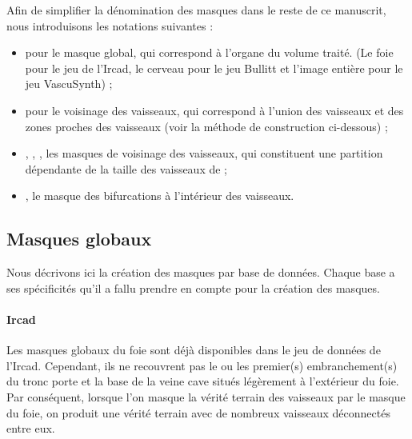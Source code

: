 Afin de simplifier la dénomination des masques dans le reste de ce manuscrit, nous introduisons les notations suivantes :

\begin{itemize}
  \item \maskglobal pour le masque global, qui correspond à l'organe du volume traité. (Le foie pour le jeu de l'Ircad, le cerveau pour le jeu Bullitt et l'image entière pour le jeu VascuSynth) ;
  \item \maskvascular pour le voisinage des vaisseaux, qui correspond à l'union des vaisseaux et des zones proches des vaisseaux (voir la méthode de construction ci-dessous) ;
  \item \maskvesselLarge, \maskvesselMedium, \maskvesselSmall, les masques de voisinage des vaisseaux, qui constituent une partition dépendante de la taille des vaisseaux de \maskvascular;
  \item \maskbif, le masque des bifurcations à l'intérieur des vaisseaux.
  \end{itemize}

\subsection{Masques globaux}

Nous décrivons ici la création des masques par base de données. Chaque base a ses spécificités qu'il a fallu prendre en compte pour la création des masques.

\paragraph{Ircad}
Les masques globaux du foie sont déjà disponibles dans le jeu de données de l'Ircad. Cependant, ils ne recouvrent pas le ou les premier(s) embranchement(s) du tronc porte et la base de la veine cave situés légèrement à l'extérieur du foie. Par conséquent, lorsque l'on masque la vérité terrain des vaisseaux par le masque du foie, on produit une vérité terrain avec de nombreux vaisseaux déconnectés entre eux. 


